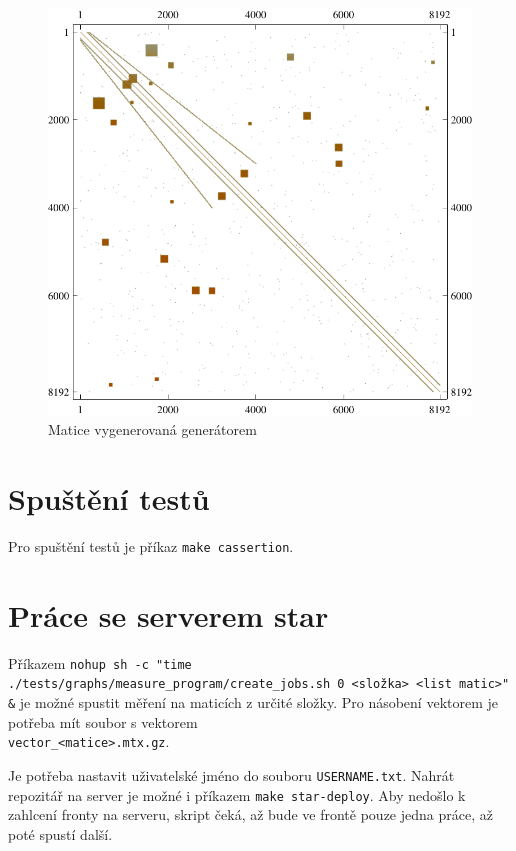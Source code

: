 \documentclass[thesis=B,czech]{FITthesis}[2012/06/26]
\begin{document}
\begin{figure}[htb]
	\includegraphics[width=1.0\textwidth]{./images/generated_matrix}
	\caption{Matice vygenerovaná generátorem}
	\label{fig:generatedMtx}
\end{figure}

\section{Spuštění testů}

Pro spuštění testů je příkaz \texttt{make cassertion}.

\section{Práce se serverem star}

Příkazem \texttt{nohup sh -c "time ./tests/graphs/measure\_program/create\_jobs.sh 0 <složka> <list matic>" \&} je možné spustit měření na maticích z určité složky. Pro násobení vektorem je potřeba mít soubor s vektorem \\ \texttt{vector\_<matice>.mtx.gz}.

Je potřeba nastavit uživatelské jméno do souboru \texttt{USERNAME.txt}. Nahrát repozitář na server je možné i příkazem \texttt{make star-deploy}. Aby nedošlo k zahlcení fronty na serveru, skript čeká, až  bude ve frontě pouze jedna práce, až poté spustí další.
\end{document}
